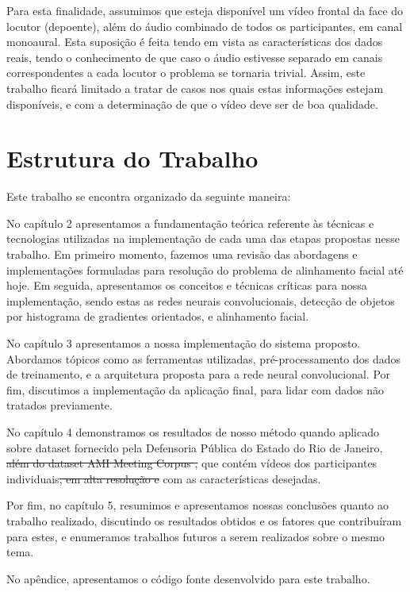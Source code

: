 Para esta finalidade, assumimos que esteja disponível um vídeo frontal da face do locutor (depoente), além do áudio combinado de todos os participantes, em canal monoaural.
Esta suposição é feita tendo em vista as características dos dados reais, tendo o conhecimento de que caso o áudio estivesse separado em canais correspondentes a cada locutor o problema se tornaria trivial.
Assim, este trabalho ficará limitado a tratar de casos nos quais estas informações estejam disponíveis, e com a determinação de que o vídeo deve ser de boa qualidade.

\section{Estrutura do Trabalho}
\label{sec:structure}

Este trabalho se encontra organizado da seguinte maneira:

No capítulo 2 apresentamos a fundamentação teórica referente às técnicas e tecnologias utilizadas na implementação de cada uma das etapas propostas nesse trabalho.
Em primeiro momento, fazemos uma revisão das abordagens e implementações formuladas para resolução do problema de alinhamento facial até hoje. 
Em seguida, apresentamos os conceitos e técnicas críticas para nossa implementação, sendo estas as redes neurais convolucionais, detecção de objetos por histograma de gradientes orientados, e alinhamento facial.

No capítulo 3 apresentamos a nossa implementação do sistema proposto. 
Abordamos tópicos como as ferramentas utilizadas, pré-processamento dos dados de treinamento, e a arquitetura proposta para a rede neural convolucional.
Por fim, discutimos a implementação da aplicação final, para lidar com dados não tratados previamente.

No capítulo 4 demonstramos os resultados de nosso método quando aplicado sobre dataset fornecido pela Defensoria Pública do Estado do Rio de Janeiro, \sout{além do dataset AMI Meeting Corpus \cite{mccowanAMIMeetingCorpus2005},} que contém vídeos dos participantes individuais\sout{, em alta resolução e} com as características desejadas.

Por fim, no capítulo 5, resumimos e apresentamos nossas conclusões quanto ao trabalho realizado, discutindo os resultados obtidos e os fatores que contribuíram para estes, e enumeramos trabalhos futuros a serem realizados sobre o mesmo tema.

No apêndice, apresentamos o código fonte desenvolvido para este trabalho.